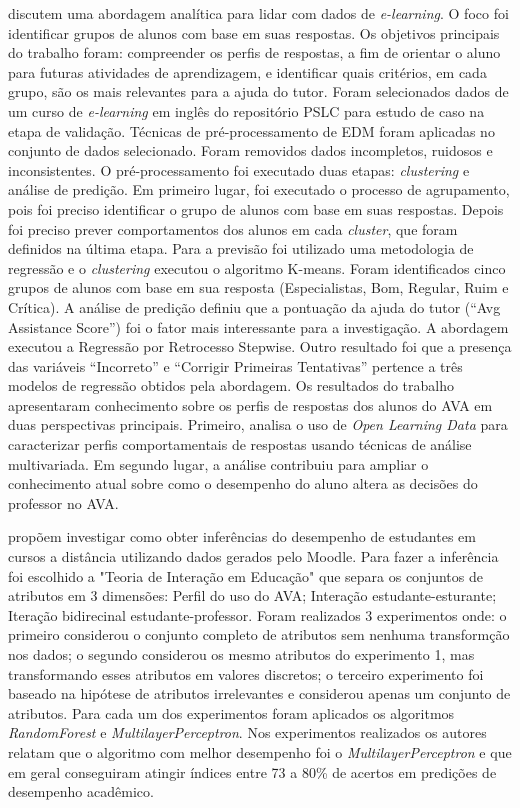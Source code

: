 \documentclass[ti]{texufpel} %
\begin{document}
\citet{de2014monitoring} discutem uma abordagem analítica para lidar com dados de \textit{e-learning}. O foco foi identificar grupos de alunos com base em suas respostas. Os objetivos principais do trabalho foram: compreender os perfis de respostas, a fim de orientar o aluno para futuras atividades de aprendizagem, e identificar quais critérios, em cada grupo, são os mais relevantes para a ajuda do tutor. Foram selecionados dados de um curso de \textit{e-learning} em inglês do repositório PSLC para estudo de caso na etapa de validação. Técnicas de pré-processamento de EDM foram aplicadas no conjunto de dados selecionado. Foram removidos dados incompletos, ruidosos e inconsistentes. O pré-processamento foi executado duas etapas: \textit{clustering} e análise de predição. Em primeiro lugar, foi executado o processo de agrupamento, pois foi preciso identificar o grupo de alunos com base em suas respostas. Depois foi preciso prever comportamentos dos alunos em cada \textit{cluster}, que foram definidos na última etapa. Para a previsão foi utilizado uma metodologia de regressão e o \textit{clustering} executou o algoritmo K-means. Foram identificados cinco grupos de alunos com base em sua resposta (Especialistas, Bom, Regular, Ruim e Crítica). A análise de predição definiu que a pontuação da ajuda do tutor (``Avg Assistance Score'') foi o fator mais interessante para a investigação. A abordagem executou a Regressão por Retrocesso Stepwise. Outro resultado foi que a presença das variáveis ``Incorreto'' e ``Corrigir Primeiras Tentativas'' pertence a três modelos de regressão obtidos pela abordagem. Os resultados do trabalho apresentaram conhecimento sobre os perfis de respostas dos alunos do AVA em duas perspectivas principais. Primeiro, analisa o uso de \textit{Open Learning Data} para caracterizar perfis comportamentais de respostas usando técnicas de análise multivariada. Em segundo lugar, a análise contribuiu para ampliar o conhecimento atual sobre como o desempenho do aluno altera as decisões do professor no AVA.

\citet{gottardo2014estimativa} propõem investigar como obter inferências do desempenho de estudantes em cursos a distância utilizando dados gerados pelo Moodle. Para fazer a inferência foi escolhido a "Teoria de Interação em Educação" que separa os conjuntos de atributos em 3 dimensões: Perfil do uso do AVA; Interação estudante-esturante; Iteração bidirecinal estudante-professor. Foram realizados 3 experimentos onde: o primeiro considerou o conjunto completo de atributos sem nenhuma transformção nos dados; o segundo considerou os mesmo atributos do experimento 1, mas transformando esses atributos em valores discretos; o terceiro experimento foi baseado na hipótese de atributos irrelevantes e considerou apenas um conjunto de atributos. Para cada um dos experimentos foram aplicados os algoritmos \textit{RandomForest} e \textit{MultilayerPerceptron}.   Nos experimentos realizados os autores relatam que o algoritmo com melhor desempenho foi o \textit{MultilayerPerceptron} e que em geral conseguiram atingir índices entre 73 a 80\% de acertos em predições de desempenho acadêmico.
\end{document}
